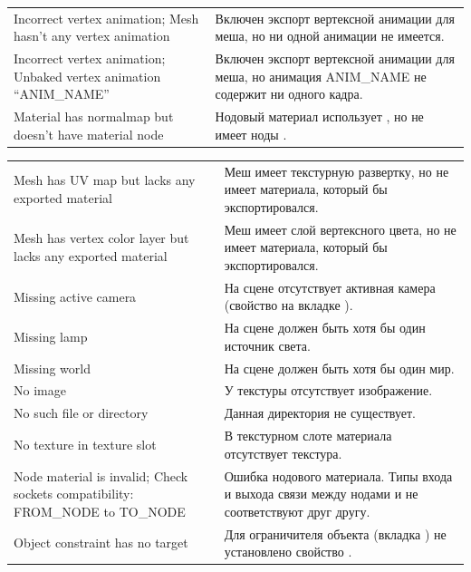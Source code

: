 \documentclass[a4paper,12pt,oneside]{sphinxmanual}
\begin{document}
\begin{tabulary}{\linewidth}{|L|L|}
Incorrect vertex animation; Mesh
hasn't any vertex animation
 & 
Включен экспорт вертексной анимации для
меша, но ни одной анимации не имеется.
\\

Incorrect vertex animation; Unbaked
vertex animation ``ANIM\_NAME''
 & 
Включен экспорт вертексной анимации для
меша, но анимация ANIM\_NAME не содержит
ни одного кадра.
\\

Material has normalmap but doesn't
have material node
 & 
Нодовый материал использует
, но не имеет ноды
.
\\
\hline\end{tabulary}


\begin{tabulary}{\linewidth}{|L|L|}
\hline

Mesh has UV map but lacks any
exported material
 & 
Меш имеет текстурную развертку, но не
имеет материала, который бы
экспортировался.
\\

Mesh has vertex color layer but
lacks any exported material
 & 
Меш имеет слой вертексного цвета, но не
имеет материала, который бы
экспортировался.
\\

Missing active camera
 & 
На сцене отсутствует активная камера
(свойство  на вкладке
).
\\

Missing lamp
 & 
На сцене должен быть хотя бы один
источник света.
\\

Missing world
 & 
На сцене должен быть хотя бы один мир.
\\

No image
 & 
У текстуры отсутствует изображение.
\\

No such file or directory
 & 
Данная директория не существует.
\\

No texture in texture slot
 & 
В текстурном слоте материала отсутствует
текстура.
\\

Node material is invalid; Check
sockets compatibility: FROM\_NODE to
TO\_NODE
 & 
Ошибка нодового материала. Типы входа и
выхода связи между нодами  и
 не соответствуют друг другу.
\\

Object constraint has no target
 & 
Для ограничителя объекта
(вкладка )
не установлено свойство
.
\\


\end{tabulary}
\end{document}
